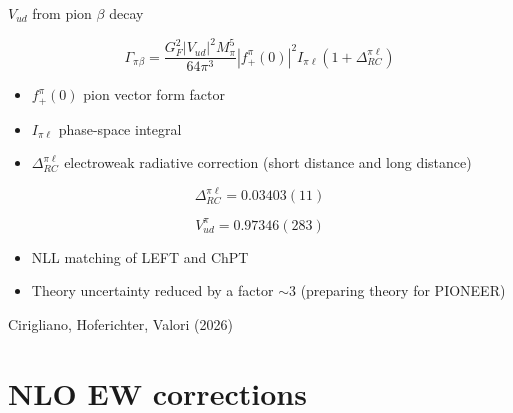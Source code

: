 \documentclass[11pt]{beamer}
\begin{document}
\begin{frame}{$V_{ud}$ from pion $\beta$ decay}

\[
\Gamma_{\pi\beta}
=
\frac{G_F^2 |V_{ud}|^2 M_\pi^5}
     {64\pi^3}
|f_+^\pi(0)|^2
I_{\pi\ell}
(1+\Delta_{RC}^{\pi\ell})
\]

\begin{itemize}
    \item $f_+^\pi(0)$ pion vector form factor
    \item $I_{\pi\ell}$ phase-space integral
    \item $\Delta_{RC}^{\pi\ell}$ electroweak radiative correction (short distance and long distance)
\end{itemize}

\[
\Delta_{RC}^{\pi\ell}=0.03403(11)
\]

\[
V_{ud}^{\pi}=0.97346(283)
\]

\begin{itemize}
    \item NLL matching of LEFT and ChPT
    \item Theory uncertainty reduced by a factor $\sim 3$ (preparing theory for PIONEER)
\end{itemize}

{\footnotesize
Cirigliano, Hoferichter, Valori (2026)
}
\end{frame}












\section{NLO EW corrections}
\end{document}
